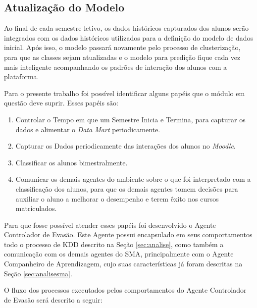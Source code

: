 \subsection{Atualização do Modelo}

Ao final de cada semestre letivo, os dados históricos capturados dos alunos serão integrados com os dados históricos utilizados para a definição do modelo de dados inicial. Após isso, o modelo passará novamente pelo processo de clusterização, para que as classes sejam atualizadas e o modelo para predição fique cada vez mais inteligente acompanhando os padrões de interação dos alunos com a plataforma.


Para o presente trabalho foi possível identificar alguns papéis que o módulo em questão deve suprir. Esses papéis são:
\begin{enumerate}
\item Controlar o Tempo em que um Semestre Inicia e Termina, para capturar os dados e alimentar o \textit{Data Mart} periodicamente.
\item Capturar os Dados periodicamente das interações dos alunos no \textit{Moodle}.
\item Classificar os alunos bimestralmente.
\item Comunicar os demais agentes do ambiente sobre o que foi interpretado com a classificação dos alunos, para que os demais agentes tomem decisões para auxiliar o aluno a melhorar o desempenho e terem êxito nos cursos matriculados.
\end{enumerate}

Para que fosse possível atender esses papéis foi desenvolvido o Agente Controlador de Evasão. Este Agente possui encapsulado em seus comportamentos todo o processo de KDD descrito na Seção \ref{sec:analise}, como também a comunicação com os demais agentes do SMA, principalmente com o Agente Companheiro de Aprendizagem, cujo suas características já foram descritas na Seção \ref{sec:analisesma}.

O fluxo dos processos executados pelos comportamentos do Agente Controlador de Evasão será descrito a seguir:

